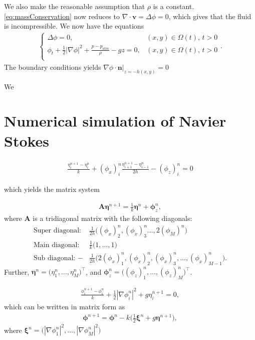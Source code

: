 \documentclass[12pt]{article}
\begin{document}
We also make the reasonable assumption that $\rho$ is a constant. \eqref{eq:massConservation} now reduces to
$\nabla \cdot \bm{v} = \Delta \phi = 0$, which gives that the fluid is incompressible. We now have
the equations
\begin{align}
    \begin{cases}
        \Delta \phi = 0,                                                 &  (x,y) \in \Omega(t), \, t > 0 \\
        \phi_t + \frac{1}{2}|\nabla \phi|^2 + \frac{p-p_{atm}}{\rho} - g z = 0,
                                                                         &  (x,y) \in \Omega(t), \, t > 0 \\
    \end{cases}.
\end{align}
The boundary conditions yields $\nabla \phi \cdot \bm{n}|_{z = -h(x,y)} = 0$

We 

\section{Numerical simulation of Navier Stokes}

\begin{align*}
    \frac{\eta_i^{n+1} - \eta_i^n}{k} + (\phi_x)_i^{n} \frac{\eta_{i+1}^{n+1}-\eta_{i-1}^{n}}{2h} - (\phi_z)_i^n = 0
\end{align*}

which yields the matrix system

\begin{align}
    \label{eq:etan+1}
    \bm{A} \bm{\eta}^{n+1} = \frac{1}{k}\bm{\eta}^n + \bm{\phi}_z^n,
\end{align}
where $\bm{A}$ is a tridiagonal matrix with the following diagonals:
\begin{align*}
    \text{Super diagonal: } &\frac{1}{2h} \Big((\phi_x)_2^{n}, (\phi_x)_3^{n} \dots, 2(\phi_M)^{n}\Big) \\
    \text{Main diagonal: }  &\frac{1}{k}  \Big(1, \dots, 1\Big)                                        \\
    \text{Sub diagonal: }  -&\frac{1}{2h} \Big(2(\phi_x)_1^{n}, (\phi_x)_2^{n}, (\phi_x)_3^{n}, \dots, (\phi_x)_{M-1}^n \Big).
\end{align*}
Further, $\bm{\eta}^{n} = \Big(\eta_1^n, \dots, \eta_M^n\Big)^\top$, and $\bm{\phi}_z^n = \Big((\phi_z)_1^n, \dots, (\phi_z)_M^n\Big)^\top$.

\begin{align*}
    \frac{\phi_i^{n+1}-\phi_i^n}{k} + \frac{1}{2}|\nabla \phi_i^n|^2 + g \eta_i^{n+1} = 0,
\end{align*}
which can be written in matrix form as
\begin{align}
    \label{eq:phin+1}
    \bm{\phi}^{n+1} = \bm{\phi}^n - k\bigg(\frac{1}{2}\bm{\xi}^n + g \bm{\eta}^{n+1}\bigg),
\end{align}
where $\bm{\xi}^n = \Big(|\nabla \phi_1^n|^2, \dots,  |\nabla \phi_M^n|^2\bigg)$
\end{document}
